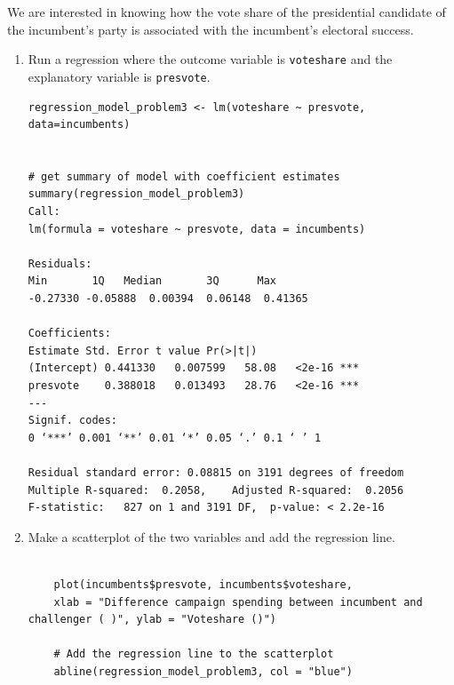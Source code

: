 \documentclass[12pt,letterpaper]{article}
\begin{document}
\noindent We are interested in knowing how the vote share of the presidential candidate of the incumbent's party is associated with the incumbent's electoral success.
\vspace{.25cm}
\begin{enumerate}
\item Run a regression where the outcome variable is \texttt{voteshare} and the explanatory variable is \texttt{presvote}.

\begin{verbatim}
regression_model_problem3 <- lm(voteshare ~ presvote, data=incumbents)
	

# get summary of model with coefficient estimates 
summary(regression_model_problem3)
Call:
lm(formula = voteshare ~ presvote, data = incumbents)

Residuals:
Min       1Q   Median       3Q      Max 
-0.27330 -0.05888  0.00394  0.06148  0.41365 

Coefficients:
Estimate Std. Error t value Pr(>|t|)    
(Intercept) 0.441330   0.007599   58.08   <2e-16 ***
presvote    0.388018   0.013493   28.76   <2e-16 ***
---
Signif. codes:  
0 ‘***’ 0.001 ‘**’ 0.01 ‘*’ 0.05 ‘.’ 0.1 ‘ ’ 1

Residual standard error: 0.08815 on 3191 degrees of freedom
Multiple R-squared:  0.2058,	Adjusted R-squared:  0.2056 
F-statistic:   827 on 1 and 3191 DF,  p-value: < 2.2e-16

\end{verbatim}

\item Make a scatterplot of the two variables and add the regression line. 
\vspace{5cm}
\begin{verbatim}

	plot(incumbents$presvote, incumbents$voteshare, 
	xlab = "Difference campaign spending between incumbent and challenger ( )", ylab = "Voteshare ()")
	
	# Add the regression line to the scatterplot
	abline(regression_model_problem3, col = "blue")
	

\end{verbatim}
\end{enumerate}
\end{document}
